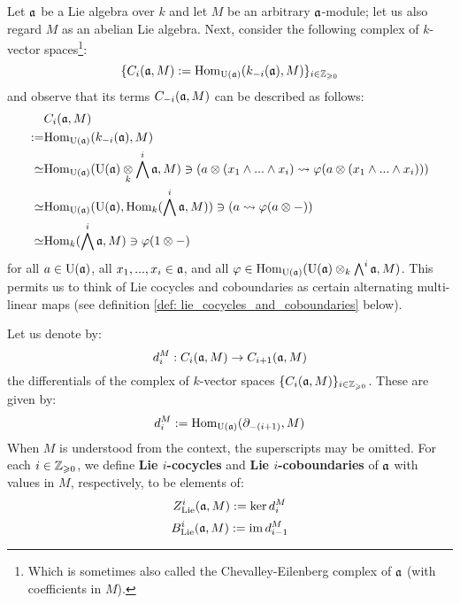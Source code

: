         \begin{remark} \label{remark: simplified_chevalley_eilenberg_complexes}
            Let $\mathfrak{a}$ be a Lie algebra over $k$ and let $M$ be an arbitrary $\mathfrak{a}$-module; let us also regard $M$ as an abelian Lie algebra. Next, consider the following complex of $k$-vector spaces\footnote{Which is sometimes also called the Chevalley-Eilenberg complex of $\mathfrak{a}$ (with coefficients in $M$).}:
                $$\{ C_i(\mathfrak{a}, M) := \mathrm{Hom}_{\mathrm{U}(\mathfrak{a})}(k_{-i}(\mathfrak{a}), M) \}_{i \in \mathbb{Z}_{\geqslant 0}}$$
            and observe that its terms $C_{-i}(\mathfrak{a}, M)$ can be described as follows:
                $$
                    \begin{aligned}
                        & C_i(\a, M)
                        \\
                        := & \Hom_{\rmU(\a)}(k_{-i}(\a), M)
                        \\
                        \cong & \Hom_{\rmU(\a)}( \rmU(\a) \tensor_k \bigwedge^i \a, M ) \ni \left( a \tensor (x_1 \wedge ... \wedge x_i) \mapsto \varphi( a \tensor (x_1 \wedge ... \wedge x_i) ) \right)
                        \\
                        \cong & \Hom_{\rmU(\a)}( \rmU(\a), \Hom_k( \bigwedge^i \a, M ) ) \ni \left( a \mapsto \varphi(a \tensor -) \right)
                        \\
                        \cong & \Hom_k( \bigwedge^i \a, M ) \ni \varphi(1 \tensor -)
                    \end{aligned}
                $$
            for all $a \in \mathrm{U}(\mathfrak{a})$, all $x_1, ..., x_i \in \mathfrak{a}$, and all $\varphi \in \Hom_{\rmU(\a)}( \rmU(\a) \tensor_k \bigwedge^i \a, M )$. This permits us to think of Lie cocycles and coboundaries as certain alternating multi-linear maps (see definition \ref{def: lie_cocycles_and_coboundaries} below).
        \end{remark}
        \begin{definition} \label{def: lie_cocycles_and_coboundaries}
            Let us denote by:
                $$d_i^M: C_i(\mathfrak{a}, M) \to C_{i + 1}(\mathfrak{a}, M)$$
            the differentials of the complex of $k$-vector spaces $\{C_i(\mathfrak{a}, M)\}_{i \in \mathbb{Z}_{\geqslant 0}}$. These are given by:
                $$d_i^M := \mathrm{Hom}_{\mathrm{U}(\mathfrak{a})}(\partial_{-(i + 1)}, M)$$
            When $M$ is understood from the context, the superscripts may be omitted. For each $i \in \mathbb{Z}_{\geqslant 0}$, we define \textbf{Lie $i$-cocycles} and \textbf{Lie $i$-coboundaries} of $\mathfrak{a}$ with values in $M$, respectively, to be elements of:
                $$Z^i_{\mathrm{Lie}}(\mathfrak{a}, M) := \ker d_i^M$$
                $$B^i_{\mathrm{Lie}}(\mathfrak{a}, M) := \operatorname{im} d_{i - 1}^M$$
        \end{definition}
